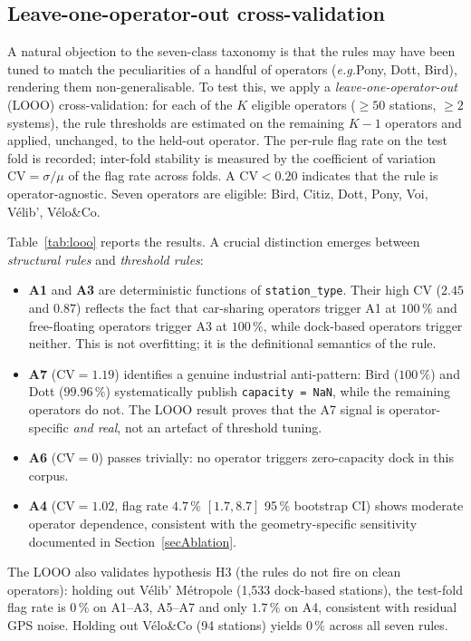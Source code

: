 \documentclass[11pt,a4paper]{article}
\newcommand{\eg}{\emph{e.g.}}
\begin{document}
\subsection{Leave-one-operator-out cross-validation}\label{secLOOO}
A natural objection to the seven-class taxonomy is that the rules
may have been tuned to match the peculiarities of a handful of
operators (\eg Pony, Dott, Bird), rendering them non-generalisable.
To test this, we apply a \emph{leave-one-operator-out} (LOOO)
cross-validation: for each of the $K$ eligible operators
($\ge 50$ stations, $\ge 2$ systems), the rule thresholds are
estimated on the remaining $K-1$ operators and applied, unchanged,
to the held-out operator. The per-rule flag rate on the test fold
is recorded; inter-fold stability is measured by the coefficient of
variation $\mathrm{CV} = \sigma / \mu$ of the flag rate across folds.
A $\mathrm{CV} < 0.20$ indicates that the rule is operator-agnostic.
Seven operators are eligible: Bird, Citiz, Dott, Pony, Voi, V\'elib',
V\'elo\&Co.

Table~\ref{tab:looo} reports the results. A crucial distinction
emerges between \emph{structural rules} and \emph{threshold rules}:
%
\begin{itemize}[nosep]
\item \textbf{A1} and \textbf{A3} are deterministic functions of
  \texttt{station\_type}. Their high CV ($2.45$ and $0.87$) reflects
  the fact that car-sharing operators trigger A1 at $100\,\%$ and
  free-floating operators trigger A3 at $100\,\%$, while dock-based
  operators trigger neither. This is not overfitting; it is the
  definitional semantics of the rule.
\item \textbf{A7} ($\mathrm{CV} = 1.19$) identifies a genuine
  industrial anti-pattern: Bird ($100\,\%$) and Dott ($99.96\,\%$)
  systematically publish \texttt{capacity = NaN}, while the
  remaining operators do not. The LOOO result proves that the A7
  signal is operator-specific \emph{and real}, not an artefact of
  threshold tuning.
\item \textbf{A6} ($\mathrm{CV} = 0$) passes trivially: no
  operator triggers zero-capacity dock in this corpus.
\item \textbf{A4} ($\mathrm{CV} = 1.02$, flag rate
  $4.7\,\%$ $[1.7, 8.7]$ 95\,\% bootstrap CI) shows moderate
  operator dependence, consistent with the geometry-specific
  sensitivity documented in Section~\ref{secAblation}.
\end{itemize}
%
The LOOO also validates hypothesis H3 (the rules do not fire on
clean operators): holding out V\'elib' M\'etropole (1{,}533
dock-based stations), the test-fold flag rate is $0\,\%$ on A1--A3,
A5--A7 and only $1.7\,\%$ on A4, consistent with residual GPS noise.
Holding out V\'elo\&Co (94 stations) yields $0\,\%$ across all
seven rules.
\end{document}
